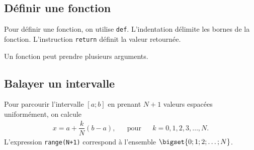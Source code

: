 

\usepackage{minted}



\pagestyle{fancy}
\fancyhead[R]{\today}

\subsection*{Définir une fonction}

\begin{multicols}{3}
	Pour définir une fonction, on utilise \texttt{def}.
	L'indentation délimite les bornes de la fonction.
	L'instruction \texttt{return} définit la valeur retournée.
	
	Un fonction peut prendre plusieurs arguments.
	
	\columnbreak
	\centering
	\begin{minipage}{.1\textwidth}
	\end{minipage}	
	
	\columnbreak
	\centering
	\begin{minipage}{.1\textwidth}
	\end{minipage}
\end{multicols}


\subsection*{Balayer un intervalle}

\begin{multicols}{2}
	Pour parcourir l'intervalle $[a ; b]$ en prenant $N+1$ valeurs espacées uniformément,
	on calcule
		\begin{align*} 
			x = a + \dfrac{k}N (b-a), && \text{pour} && k = 0, 1, 2, 3, \dots, N.
		\end{align*}
	L'expression \texttt{range(N+1)} correspond à l'ensemble ${\bigset{ 0 ; 1 ; 2 ; \dots ; N }}$.

	\columnbreak
	\centering
	\begin{minipage}{.2\textwidth}
	\end{minipage}
\end{multicols}


